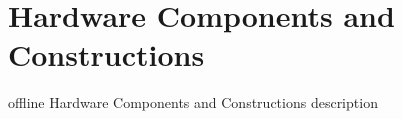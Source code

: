 \section{Hardware Components and Constructions}

offline Hardware Components and Constructions description

